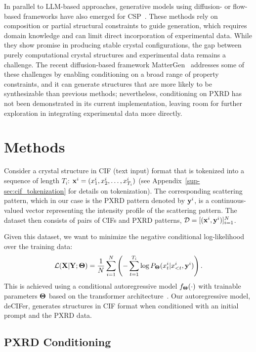 In parallel to LLM-based approaches, generative models using diffusion- or flow-based frameworks have also emerged for CSP~\cite{jiao2023crystal, millerflowmm,zeni2025generative}. These methods rely on composition or partial structural constraints to guide generation, which requires domain knowledge and can limit direct incorporation of experimental data. While they show promise in producing stable crystal configurations, the gap between purely computational crystal structures and experimental data remains a challenge. The recent diffusion-based framework MatterGen~\cite{zeni2025generative} addresses some of these challenges by enabling conditioning on a broad range of property constraints, and it can generate structures that are more likely to be synthesizable than previous methods; nevertheless, conditioning on PXRD has not been demonstrated in its current implementation, leaving room for further exploration in integrating experimental data more directly.

\section{Methods}

Consider a crystal structure in CIF (text input) format that is tokenized into a sequence of length $T_i$: ${\mathbf x}^i = (x^i_1,x^i_2, \dots, x^i_{T_i})$ (see Appendix~\ref{sup-sec:cif_tokenization} for details on tokenization). The corresponding scattering pattern, which in our case is the PXRD pattern denoted by ${\mathbf y}^i$, is a continuous-valued vector representing the intensity profile of the scattering pattern. The dataset then consists of pairs of CIFs and PXRD patterns, ${\mathcal D} = [({\mathbf x}^i,{\mathbf y}^i)]_{i=1}^{N}$. 

Given this dataset, we want to minimize the negative conditional log-likelihood over the training data: 
%
\begin{equation}
    {\mathcal L}({\mathbf X}|{\mathbf Y};{\mathbf \Theta}) = \frac{1}{N} \sum_{i=1}^{N} \left( -\sum_{t=1}^{T_i} \log P_{\mathbf \Theta}(x^i_t|x^i_{<t},{\mathbf y}^i)\right). 
\end{equation}
This is achieved using a conditional autoregressive model $f_{\mathbf \Theta}(\cdot)$ with trainable parameters ${\mathbf \Theta}$ based on the transformer architecture~\cite{vaswani2017attentionneed}. Our autoregressive model, deCIFer, generates structures in CIF format when conditioned with an initial prompt and the PXRD data.

\subsection{PXRD Conditioning}\label{sec:PXRD_conditioning}

